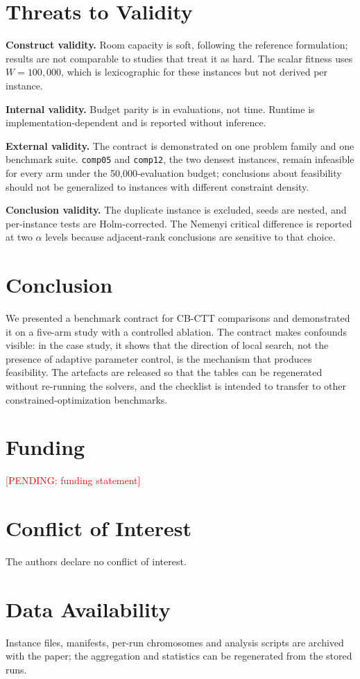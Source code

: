 \documentclass[journal]{IEEEtran}
\newcommand{\pending}[1]{\textcolor{red}{[PENDING: #1]}}
\newcommand{\code}[1]{\texttt{#1}}
\begin{document}
\section{Threats to Validity}
\textbf{Construct validity.} Room capacity is soft, following the reference formulation; results are not comparable to studies that treat it as hard. The scalar fitness uses $W=100{,}000$, which is lexicographic for these instances but not derived per instance.

\textbf{Internal validity.} Budget parity is in evaluations, not time. Runtime is implementation-dependent and is reported without inference.

\textbf{External validity.} The contract is demonstrated on one problem family and one benchmark suite. \code{comp05} and \code{comp12}, the two densest instances, remain infeasible for every arm under the 50{,}000-evaluation budget; conclusions about feasibility should not be generalized to instances with different constraint density.

\textbf{Conclusion validity.} The duplicate instance is excluded, seeds are nested, and per-instance tests are Holm-corrected. The Nemenyi critical difference is reported at two $\alpha$ levels because adjacent-rank conclusions are sensitive to that choice.

\section{Conclusion}
We presented a benchmark contract for CB-CTT comparisons and demonstrated it on a five-arm study with a controlled ablation. The contract makes confounds visible: in the case study, it shows that the direction of local search, not the presence of adaptive parameter control, is the mechanism that produces feasibility. The artefacts are released so that the tables can be regenerated without re-running the solvers, and the checklist is intended to transfer to other constrained-optimization benchmarks.

\section*{Funding}
\pending{funding statement}

\section*{Conflict of Interest}
The authors declare no conflict of interest.

\section*{Data Availability}
Instance files, manifests, per-run chromosomes and analysis scripts are archived with the paper; the aggregation and statistics can be regenerated from the stored runs.



\end{document}
